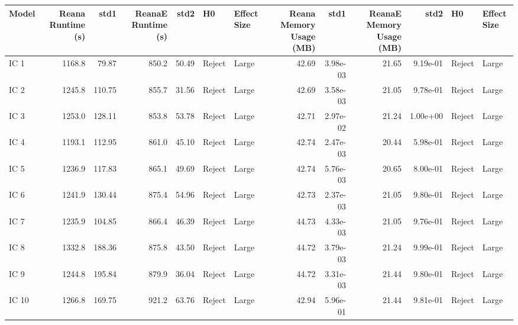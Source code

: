 \begin{tabular}{lrrrrllrrrrll}
\toprule
 Model &  Reana Runtime (s) &    std1 &  ReanaE Runtime (s) &   std2 &      H0 & Effect Size &  Reana Memory Usage (MB) &      std1 &  ReanaE Memory Usage (MB) &      std2 &      H0 & Effect Size \\
\midrule
  IC 1 &             1168.8 &   79.87 &               850.2 &  50.49 &  Reject &       Large &                    42.69 &  3.98e-03 &                     21.65 &  9.19e-01 &  Reject &       Large \\
  IC 2 &             1245.8 &  110.75 &               855.7 &  31.56 &  Reject &       Large &                    42.69 &  3.58e-03 &                     21.05 &  9.78e-01 &  Reject &       Large \\
  IC 3 &             1253.0 &  128.11 &               853.8 &  53.78 &  Reject &       Large &                    42.71 &  2.97e-02 &                     21.24 &  1.00e+00 &  Reject &       Large \\
  IC 4 &             1193.1 &  112.95 &               861.0 &  45.10 &  Reject &       Large &                    42.74 &  2.47e-03 &                     20.44 &  5.98e-01 &  Reject &       Large \\
  IC 5 &             1236.9 &  117.83 &               865.1 &  49.69 &  Reject &       Large &                    42.74 &  5.76e-03 &                     20.65 &  8.00e-01 &  Reject &       Large \\
  IC 6 &             1241.9 &  130.44 &               875.4 &  54.96 &  Reject &       Large &                    42.73 &  2.37e-03 &                     21.05 &  9.80e-01 &  Reject &       Large \\
  IC 7 &             1235.9 &  104.85 &               866.4 &  46.39 &  Reject &       Large &                    44.73 &  4.33e-03 &                     21.05 &  9.76e-01 &  Reject &       Large \\
  IC 8 &             1332.8 &  188.36 &               875.8 &  43.50 &  Reject &       Large &                    44.72 &  3.79e-03 &                     21.24 &  9.99e-01 &  Reject &       Large \\
  IC 9 &             1244.8 &  195.84 &               879.9 &  36.04 &  Reject &       Large &                    44.72 &  3.31e-03 &                     21.44 &  9.80e-01 &  Reject &       Large \\
 IC 10 &             1266.8 &  169.75 &               921.2 &  63.76 &  Reject &       Large &                    42.94 &  5.96e-01 &                     21.44 &  9.81e-01 &  Reject &       Large \\

\end{tabular}

